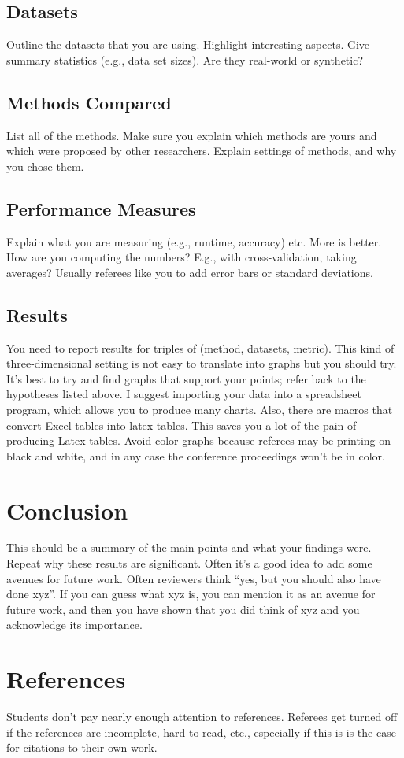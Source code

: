 \documentclass{article}
\begin{document}
\subsection{Datasets} Outline the datasets that you are using. Highlight interesting aspects. Give summary statistics (e.g., data set sizes). Are they real-world or synthetic?

\subsection{Methods Compared} List all of the methods. Make sure you explain which methods are yours and which were proposed by other researchers. Explain settings of methods, and why you chose them.
\subsection{Performance Measures} Explain what you are measuring (e.g., runtime, accuracy) etc. More is better. How are you computing the numbers? E.g., with cross-validation, taking averages? Usually referees like you to add error bars or standard deviations.
\subsection{Results} You need to report results for triples of (method, datasets, metric). This kind of three-dimensional setting is not easy to translate into graphs but you should try. It's best to try and find graphs that support your points; refer back to the hypotheses listed above. I suggest importing  your data into a spreadsheet program, which allows you to produce many charts. Also, there are macros that convert Excel tables into latex tables. This saves you a lot of the pain of producing Latex tables. Avoid color graphs because referees may be printing on black and white, and in any case the conference proceedings won't be in color.
\section{Conclusion} This should be a summary of the main points and what your findings were. Repeat why these results are significant. Often it's a good idea to add some avenues for future work. Often reviewers think ``yes, but you should also have done xyz''. If you can guess what xyz is, you can mention it as an avenue for future work, and then you have shown that you did think of xyz and you acknowledge its importance.
\section{References} Students don't pay nearly enough attention to references. Referees get turned off if the references are incomplete, hard to read, etc., especially if this is is the case for citations to their own work.
\end{document}

